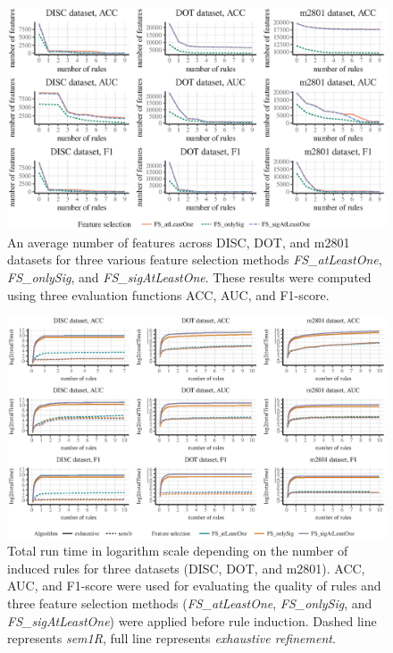 \documentclass{bmcart}
\begin{document}
\begin{backmatter}
\begin{figure}[h!]
\caption{\csentence{} An average number of features across DISC, DOT, and m2801 datasets for three various feature selection methods \emph{FS\_atLeastOne}, \emph{FS\_onlySig}, and \emph{FS\_sigAtLeastOne}. These results were computed using three evaluation functions ACC, AUC, and F1-score.}
\label{fig:feature_selection_methods}
\includegraphics{Fig4.eps}
\end{figure}

\begin{figure}[h!]
\caption{\csentence{} Total run time in logarithm scale depending on the number of induced rules for three datasets (DISC, DOT, and m2801). ACC, AUC, and F1-score were used for evaluating the quality of rules and three feature selection methods (\emph{FS\_atLeastOne}, \emph{FS\_onlySig}, and \emph{FS\_sigAtLeastOne}) were applied before rule induction. Dashed line represents \emph{sem1R}, full line represents \emph{exhaustive refinement}.}
\label{fig:final_results}
\includegraphics{Fig5.eps}
\end{figure}


\end{backmatter}
\end{document}
